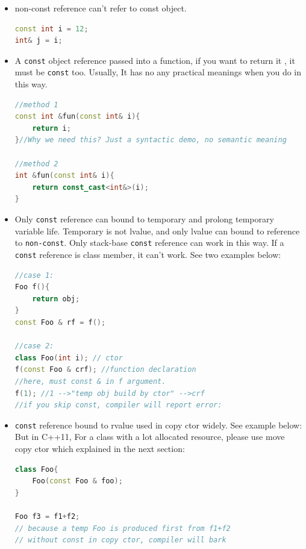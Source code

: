 \documentclass[a4paper,11pt,twoside]{book}
\begin{document}
\begin{itemize}
\item non-const reference can't refer to const object.
\begin{lstlisting}[frame=single, language=c++]
const int i = 12;
int& j = i;
\end{lstlisting}

\item A \texttt{const} object reference passed into a function, if you want to return it , it must be \texttt{const} too. Usually, It has no any practical meanings when you do in this way. 
\begin{lstlisting}[frame=single, language=c++]
//method 1
const int &fun(const int& i){
	return i;
}//Why we need this? Just a syntactic demo, no semantic meaning

//method 2
int &fun(const int& i){
	return const_cast<int&>(i);
}
\end{lstlisting}

\item Only \texttt{const} reference can bound to temporary and prolong temporary variable life. Temporary is not lvalue, and only lvalue can bound to reference to \texttt{non-const}. Only stack-base \texttt{const} reference can work in this way. If a \texttt{const} reference is class member, it can't work.  See two examples below:
\begin{lstlisting}[frame=single, language=c++]
//case 1:
Foo f(){
	return obj;
}
const Foo & rf = f();

//case 2:
class Foo(int i); // ctor
f(const Foo & crf); //function declaration
//here, must const & in f argument.
f(1); //1 -->"temp obj build by ctor" -->crf
//if you skip const, compiler will report error:
\end{lstlisting}

\item \texttt{const} reference bound to rvalue used in copy ctor widely. See example below: But in C++11, For a class with a lot allocated resource, please use move copy ctor which explained in the next section:

\begin{lstlisting}[frame=single, language=c++]
class Foo{
	Foo(const Foo & foo);
}

Foo f3 = f1+f2;
// because a temp Foo is produced first from f1+f2
// without const in copy ctor, compiler will bark
\end{lstlisting}
\end{itemize}
\end{document}

